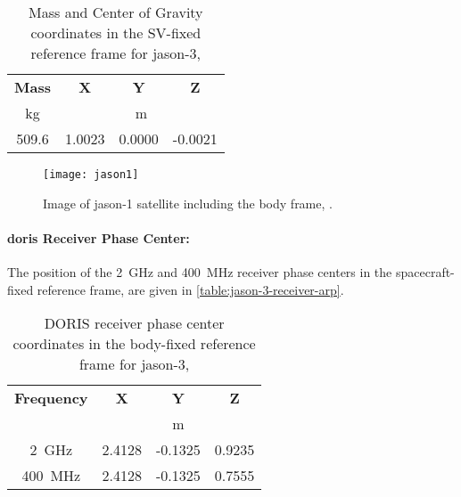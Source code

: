 \begin{table}[h!]
    \centering
    \begin{tabular}{cccc}
        \toprule
        \textbf{Mass} & \textbf{X} & \textbf{Y} & \textbf{Z} \\
        \si{\kilo\gram} & \multicolumn{3}{c}{\si{\meter}} \\
        \hline
        509.6 & 1.0023 & 0.0000 & -0.0021 \\
       \bottomrule
    \end{tabular}
    \caption{Mass and Center of Gravity coordinates in the SV-fixed reference 
        frame for \gls{jason}-3, \cite{Cerri2022}}
    \label{table:jason-3-mass}
\end{table}

\begin{figure}
    \centering
    \texttt{[image: jason1]}
    \caption{Image of \gls{jason}-1 satellite including the body frame, \cite{Cerri2022}.}
    \label{fig:jason1}
\end{figure}

\paragraph{\gls{doris} Receiver Phase Center:}
The position of the \SI{2}{\giga\hertz} and \SI{400}{\mega\hertz} receiver phase 
centers in the spacecraft-fixed reference frame, are given in \autoref{table:jason-3-receiver-arp}.
\begin{table}[h!]
    \centering
    \begin{tabular}{cccc}
        \toprule
        \textbf{Frequency} & \textbf{X} & \textbf{Y} & \textbf{Z} \\
         & \multicolumn{3}{c}{\si{\meter}} \\
        \hline
        \SI{2}{\giga\hertz} &   2.4128 & -0.1325 & 0.9235 \\
        \SI{400}{\mega\hertz} & 2.4128 & -0.1325 & 0.7555 \\
       \bottomrule
    \end{tabular}
    \caption{DORIS receiver phase center coordinates in the body-fixed reference 
        frame for \gls{jason}-3, \cite{Cerri2022}}
    \label{table:jason-3-receiver-arp}
\end{table}

